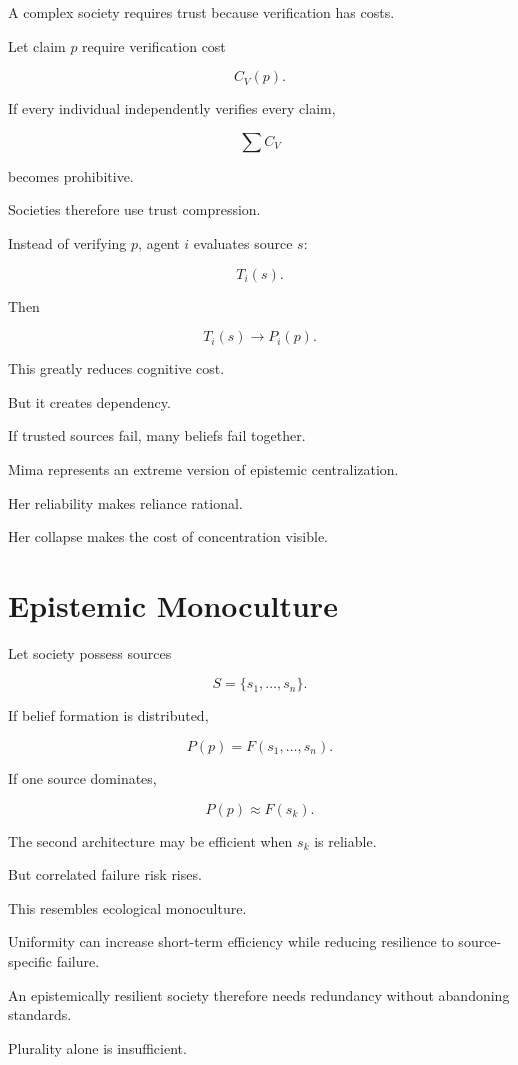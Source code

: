\documentclass[11pt,oneside]{book}
\theoremstyle{definition}
\theoremstyle{remark}
\begin{document}
A complex society requires trust because verification has costs.

Let claim \(p\) require verification cost

\[
C_V(p).
\]

If every individual independently verifies every claim,

\[
\sum C_V
\]

becomes prohibitive.

Societies therefore use trust compression.

Instead of verifying \(p\), agent \(i\) evaluates source \(s\):

\[
T_i(s).
\]

Then

\[
T_i(s)
\rightarrow
P_i(p).
\]

This greatly reduces cognitive cost.

But it creates dependency.

If trusted sources fail, many beliefs fail together.

Mima represents an extreme version of epistemic centralization.

Her reliability makes reliance rational.

Her collapse makes the cost of concentration visible.

\section{Epistemic Monoculture}

Let society possess sources

\[
S=\{s_1,\ldots,s_n\}.
\]

If belief formation is distributed,

\[
P(p)
=
F(s_1,\ldots,s_n).
\]

If one source dominates,

\[
P(p)
\approx
F(s_k).
\]

The second architecture may be efficient when \(s_k\) is reliable.

But correlated failure risk rises.

This resembles ecological monoculture.

Uniformity can increase short-term efficiency while reducing resilience to source-specific failure.

An epistemically resilient society therefore needs redundancy without abandoning standards.

Plurality alone is insufficient.
\end{document}
